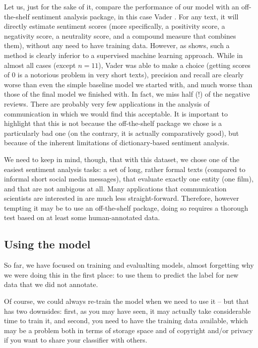 Let us, just for the sake of it, compare the performance of our model
with an off-the-shelf sentiment analysis package, in this case Vader
\citep{Hutto2014}. For any text, it will directly estimate sentiment
scores (more specifically, a positivity score, a negativity score, a
neutrality score, and a compound measure that combines them), without
any need to have training data. However, as  shows, such
a method is clearly inferior to a supervised machine learning
approach. While in almost all cases (except $n=11$), Vader was able to
make a choice (getting scores of 0 is a notorious problem in very
short texts), precision and recall are clearly worse than even the
simple baseline model we started with, and much worse than those of
the final model we finished with. In fact, we miss half (!) of the
negative reviews. There are probably very few applications in the
analysis of communication in which we would find this acceptable.
It is important to highlight that this is not because the off-the-shelf
package we chose is a particularly bad one (on the contrary, it is
actually comparatively good), but because of the inherent limitations
of dictionary-based sentiment analysis.


We need to keep in mind, though, that with this dataset, we chose one
of the easiest sentiment analysis tasks: a set of long, rather formal
texts (compared to informal short social media messages), that
evaluate exactly one entity (one film), and that are not ambigous at
all. Many applications that communication scientists are interested
in are much less straight-forward. Therefore, however tempting it may be
to use an off-the-shelf package, doing so requires a thorough test
based on at least some human-annotated data.



\subsection{Using the model}

So far, we have focused on training and evalualting models, almost
forgetting why we were doing this in the first place: to use them to
predict the label for new data that we did not annotate.

Of course, we could always re-train the model when we need to use it
-- but that has two downsides: first, as you may have seen, it may
actually take considerable time to train it, and second, you need to
have the training data available, which may be a problem both in terms
of storage space and of copyright and/or privacy if you want to share
your classifier with others.

